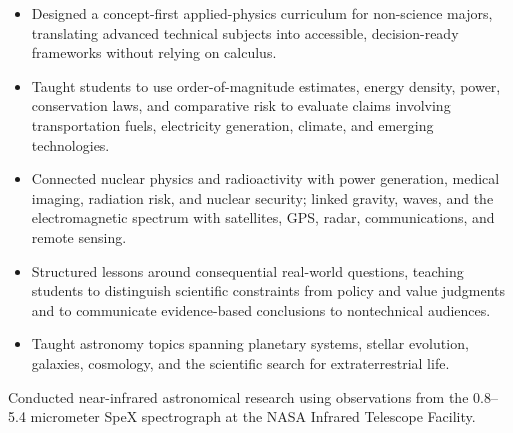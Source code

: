 \begin{itemize}
  \item Designed a concept-first applied-physics curriculum for non-science majors, translating advanced technical subjects into accessible, decision-ready frameworks without relying on calculus.
  \item Taught students to use order-of-magnitude estimates, energy density, power, conservation laws, and comparative risk to evaluate claims involving transportation fuels, electricity generation, climate, and emerging technologies.
  \item Connected nuclear physics and radioactivity with power generation, medical imaging, radiation risk, and nuclear security; linked gravity, waves, and the electromagnetic spectrum with satellites, GPS, radar, communications, and remote sensing.
  \item Structured lessons around consequential real-world questions, teaching students to distinguish scientific constraints from policy and value judgments and to communicate evidence-based conclusions to nontechnical audiences.
  \item Taught astronomy topics spanning planetary systems, stellar evolution, galaxies, cosmology, and the scientific search for extraterrestrial life.
\end{itemize}
Conducted near-infrared astronomical research using observations from the 0.8--5.4 micrometer SpeX spectrograph at the NASA Infrared Telescope Facility.
